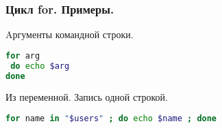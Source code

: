 \begin{frame}[fragile]
\frametitle{ Цикл for. Примеры.}
  \begin{block}{Aргументы командной строки.}
    \begin{lstlisting}[language=bash,frame=single]
for arg
 do echo $arg 
done
    \end{lstlisting}
  \end{block}
  \begin{block}{Из переменной. Запись одной строкой.}
    \begin{lstlisting}[language=bash,frame=single]
for name in "$users" ; do echo $name ; done
    \end{lstlisting}
  \end{block}
\end{frame}
